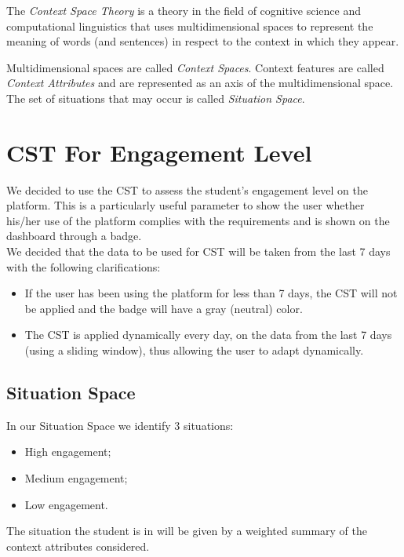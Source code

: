 The \textit{Context Space Theory} is a theory in the field of cognitive science and 
computational linguistics that uses multidimensional spaces to represent the meaning 
of words (and sentences) in respect to the context in which they appear.

Multidimensional spaces are called \textit{Context Spaces}. Context features are called 
\textit{Context Attributes} and are represented as an axis of the multidimensional space. 
The set of situations that may occur is called \textit{Situation Space}.

\section{CST For Engagement Level}
We decided to use the CST to assess the student's engagement level on the platform. 
This is a particularly useful parameter to show the user whether his/her use of the 
platform complies with the requirements and is shown on the dashboard through a badge. \\
We decided that the data to be used for CST will be taken from the last 7 days with 
the following clarifications:
\begin{itemize}
    \item If the user has been using the platform for less than 7 days, the CST will 
    not be applied and the badge will have a gray (neutral) color.
    \item The CST is applied dynamically every day, on the data from the last 7 days 
    (using a sliding window), thus allowing the user to adapt dynamically.
\end{itemize}


\subsection{Situation Space}
In our Situation Space we identify 3 situations:
\begin{itemize}
    \item High engagement;
    \item Medium engagement;
    \item Low engagement.
\end{itemize}
The situation the student is in will be given by a weighted summary of the context 
attributes considered.


